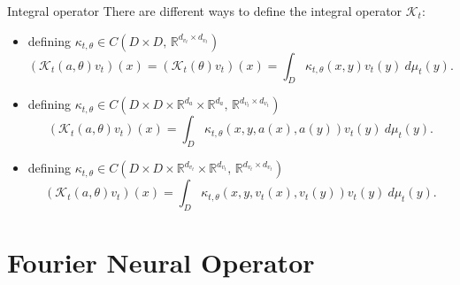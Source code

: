 \documentclass{beamer}
\newcommand{\numberset}{\mathbb}
\newcommand{\R}{\numberset{R}}
\begin{document}
\begin{frame}{Integral operator}
	There are different ways to define the integral operator $ \mathcal{K}_t $:
	\begin{itemize}
		\item defining $ \kappa_{t,\theta} \in C(D\times D,\, \R^{d_{v_{t}}\times d_{v_t}}) $
		\[ (\mathcal{K}_t(a, \theta)v_t)(x) = (\mathcal{K}_t(\theta)v_t)(x) = \int_{D} \kappa_{t,\theta}(x, y) v_{t}(y) \ d\mu_t(y).\]
		\pause
		\item defining $ \kappa_{t,\theta} \in C(D\times D\times \R^{d_a} \times \R^{d_a},\, \R^{d_{v_{t}}\times d_{v_t}}) $
		\[	(\mathcal{K}_t(a, \theta)v_t)(x) = \int_{D} \kappa_{t, \theta}\left( x, y, a\left(x\right), a\left(y\right) \right)v_t(y)  \ d\mu_t(y).\]
		\pause
		\item defining $ \kappa_{t,\theta} \in C(D\times D\times \R^{d_{v_t}} \times \R^{d_{v_t}},\, \R^{d_{v_{t}}\times d_{v_t}}) $
		\[ (\mathcal{K}_t(a, \theta)v_t)(x) = \int_{D} \kappa_{t,\theta}\left( x, y, v_{t}\left(x\right), v_t(y) \right) v_t(y)  \ d\mu_t(y). \]
	\end{itemize}
\end{frame}



\section{Fourier Neural Operator}
\end{document}
